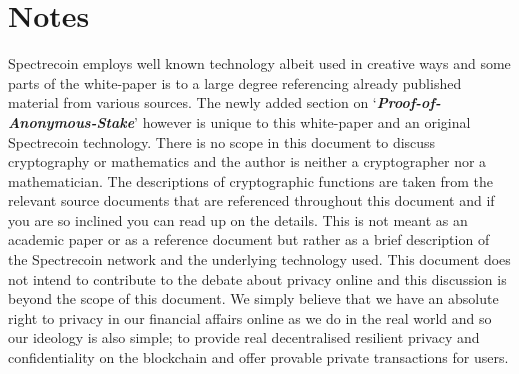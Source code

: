 \section{Notes}
Spectrecoin employs well known technology albeit used in creative ways and
some parts of the white-paper is to a large degree referencing already
published material from various sources. The newly added section on
‘\textbf{\textit{Proof-of-Anonymous-Stake}}’ however is unique to this
white-paper and an original Spectrecoin technology. There is no scope in
this document to discuss cryptography or mathematics and the author is
neither a cryptographer nor a mathematician. The descriptions of cryptographic
functions are taken from the relevant source documents that are referenced
throughout this document and if you are so inclined you can read up on the
details. This is not meant as an academic paper or as a reference document
but rather as a brief description of the Spectrecoin network and the
underlying technology used. This document does not intend to contribute
to the debate about privacy online and this discussion is beyond the scope
of this document. We simply believe that we have an absolute right to
privacy in our financial affairs online as we do in the real world and
so our ideology is also simple; to provide real decentralised resilient
privacy and confidentiality on the blockchain and offer provable private
transactions for users.
